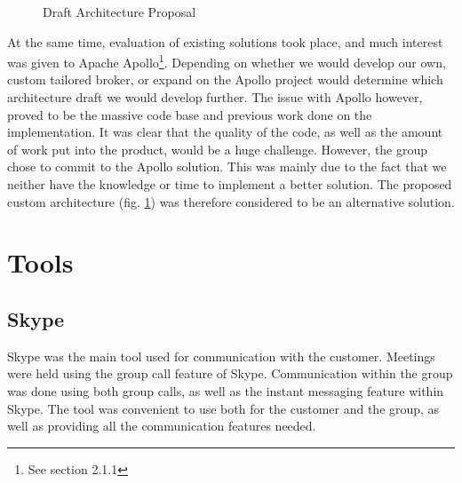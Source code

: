 \begin{center}
  \begin{figure}
    \caption{Draft Architecture Proposal}
    \label{fig:arch_proposal}
  \end{figure}
\end{center}

At the same time, evaluation of existing solutions took place, and much interest was given to Apache Apollo\footnote{See section 2.1.1}. Depending on whether we would develop our own, custom tailored broker, or expand on the Apollo project would determine which architecture draft we would develop further. The issue with Apollo however, proved to be the massive code base and previous work done on the implementation. It was clear that the quality of the code, as well as the amount of work put into the product, would be a huge challenge. However, the group chose to commit to the Apollo solution. This was mainly due to the fact that we neither have the knowledge or time to implement a better solution. The proposed custom architecture (fig. \ref{fig:arch_proposal}) was therefore considered to be an alternative solution.

\section{Tools}

\subsection{Skype}

Skype was the main tool used for communication with the customer. Meetings were held using the group call feature of Skype. Communication within the group was done using both group calls, as well as the instant messaging feature within Skype. The tool was convenient to use both for the customer and the group, as well as providing all the communication features needed.

